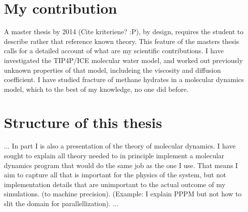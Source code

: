 \section{My contribution}
A master thesis by 2014 (Cite kriteriene? :P), by design, requires the student to describe rather that reference known theory. This feature of the masters thesis calls for a detailed account of what are my scientific contributions. I have investigated the TIP4P/ICE molecular water model, and worked out previously unknown properties of that model, includeing the viscosity and diffusion coefficient. I have studied fracture of methane hydrates in a molecular dynamics model, which to the best of my knowledge, no one did before.

\section{Structure of this thesis}
...
In part I is also a presentation of the theory of molecular dynamics. I have sought to explain all theory needed to in principle implement a molecular dynamics program that would do the same job as the one I use. That means I aim to capture all that is important for the physics of the system, but not implementation details that are unimportant to the actual outcome of my simulations. (to machine precision). (Example: I explain PPPM but not how to slit the domain for parallellization).
...
